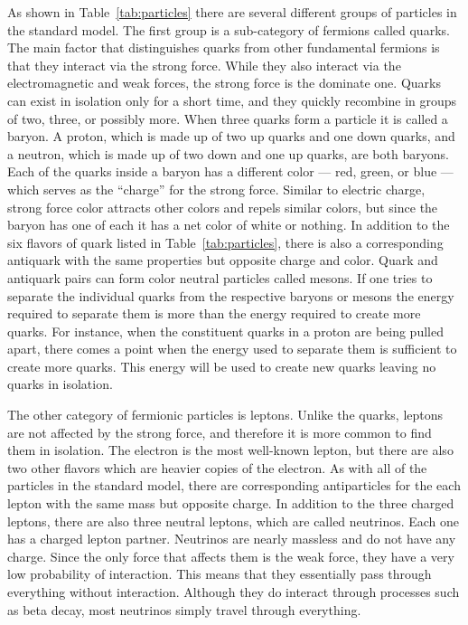 As shown in Table~\ref{tab:particles} there are several different groups of particles in the standard model. The first group is a sub-category of fermions called quarks. The main factor that distinguishes quarks from other fundamental fermions is that they interact via the strong force. While they also interact via the electromagnetic and weak forces, the strong force is the dominate one. Quarks can exist in isolation only for a short time, and they quickly recombine in groups of two, three, or possibly more. When three quarks form a particle it is called a baryon. A proton, which is made up of two up quarks and one down quarks, and a neutron, which is made up of two down and one up quarks, are both baryons. Each of the quarks inside a baryon has a different color --- red, green, or blue --- which serves as the ``charge'' for the strong force. Similar to electric charge, strong force color attracts other colors and repels similar colors, but since the baryon has one of each it has a net color of white or nothing. In addition to the six flavors of quark listed in Table~\ref{tab:particles}, there is also a corresponding antiquark with the same properties but opposite charge and color. Quark and antiquark pairs can form color neutral particles called mesons. If one tries to separate the individual quarks from the respective baryons or mesons the energy required to separate them is more than the energy required to create more quarks. For instance, when the constituent quarks in a proton are being pulled apart, there comes a point when the energy used to separate them is sufficient to create more quarks. This energy will be used to create new quarks leaving no quarks in isolation.

The other category of fermionic particles is leptons. Unlike the quarks, leptons are not affected by the strong force, and therefore it is more common to find them in isolation. The electron is the most well-known lepton, but there are also two other flavors which are heavier copies of the electron. As with all of the particles in the standard model, there are corresponding antiparticles for the each lepton with the same mass but opposite charge. In addition to the three charged leptons, there are also three neutral leptons, which are called neutrinos. Each one has a charged lepton partner. Neutrinos are nearly massless and do not have any charge. Since the only force that affects them is the weak force, they have a very low probability of interaction. This means that they essentially pass through everything without interaction. Although they do interact through processes such as beta decay, most neutrinos simply travel through everything. 

